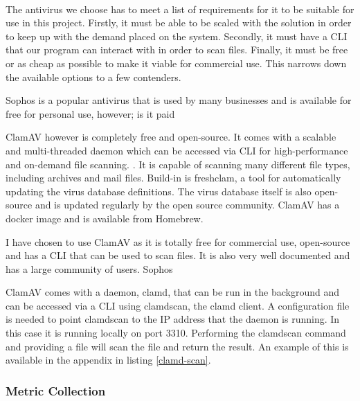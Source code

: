 \documentclass[12pt, conference, final, a4paper, onecolumn, compsoc]{IEEEtran}
\begin{document}
\paragraph{}

The antivirus we choose has to meet a list of requirements for it to be suitable
for use in this project. Firstly, it must be able to be scaled with the solution
in order to keep up with the demand placed on the system. Secondly, it must have
a CLI that our program can interact with in order to scan files. Finally, it
must be free or as cheap as possible to make it viable for commercial use. This
narrows down the available options to a few contenders.

Sophos is a popular antivirus that is used by many businesses and is available
for free for personal use, however; is it paid %

ClamAV however is completely free and open-source. It comes with a scalable and
multi-threaded daemon which can be accessed via CLI for high-performance and
on-demand file scanning. \citep{clamav}. It is capable of scanning many
different file types, including archives and mail files. Build-in is freshclam,
a tool for automatically updating the virus database definitions. The virus
database itself is also open-source and is updated regularly by the open source
community. ClamAV has a docker image and is available from Homebrew.

I have chosen to use ClamAV as it is totally free for commercial use,
open-source and has a CLI that can be used to scan files. It is also very well
documented and has a large community of users. Sophos

ClamAV comes with a daemon, clamd, that can be run in the background and can be
accessed via a CLI using clamdscan, the clamd client. A configuration file is
needed to point clamdscan to the IP address that the daemon is running. In this
case it is running locally on port 3310. Performing the clamdscan command and
providing a file will scan the file and return the result. An example of this is
available in the appendix in listing \ref{clamd-scan}.

\subsubsection*{Metric Collection}
\paragraph{}
\end{document}
